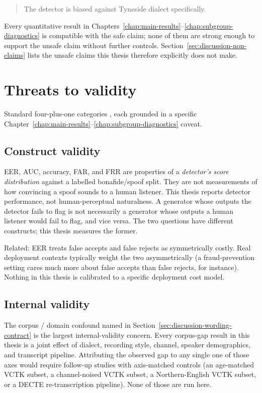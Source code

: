 \begin{quote}
The detector is biased against Tyneside dialect specifically.
\end{quote}

Every quantitative result in Chapters~\ref{chap:main-results}--\ref{chap:subgroup-diagnostics} is compatible with the
safe claim; none of them are strong enough to support the unsafe
claim without further controls. Section~\ref{sec:discussion-non-claims} lists the unsafe
claims this thesis therefore explicitly does not make.


\section{Threats to validity}
\label{sec:discussion-threats-validity}

Standard four-plus-one categories \cite{ShadishCookCampbell2002_Validity}, each
grounded in a specific Chapter~\ref{chap:main-results}--\ref{chap:subgroup-diagnostics} caveat.

\subsection{Construct validity}
\label{sec:discussion-construct-validity}

EER, AUC, accuracy, FAR, and FRR are properties of a \emph{detector's
score distribution} against a labelled bonafide/spoof split. They
are not measurements of how convincing a spoof sounds to a human
listener. This thesis reports detector performance, not
human-perceptual naturalness. A generator whose outputs the
detector fails to flag is not necessarily a generator whose outputs
a human listener would fail to flag, and vice versa. The two
questions have different constructs; this thesis measures the
former.

Related: EER treats false accepts and false rejects as
symmetrically costly. Real deployment contexts typically weight the
two asymmetrically (a fraud-prevention setting cares much more
about false accepts than false rejects, for instance). Nothing in
this thesis is calibrated to a specific deployment cost model.

\subsection{Internal validity}
\label{sec:discussion-internal-validity}

The corpus / domain confound named in Section~\ref{sec:discussion-wording-contract} is the largest
internal-validity concern. Every corpus-gap result in this thesis
is a joint effect of dialect, recording style, channel, speaker
demographics, and transcript pipeline. Attributing the observed
gap to any single one of those axes would require follow-up
studies with axis-matched controls (an age-matched VCTK subset, a
channel-noised VCTK subset, a Northern-English VCTK subset, or a
DECTE re-transcription pipeline). None of those are run here.

